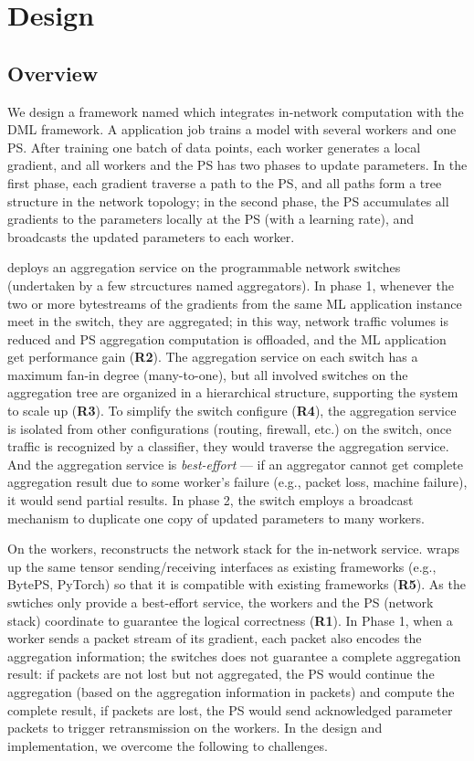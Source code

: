 \section{Design}
\subsection{Overview}
We design a framework named \sysname which integrates in-network computation with the DML framework. A \sysname application job trains a model with several workers and one PS. After training one batch of data points,  each worker generates a local gradient, and all workers and the PS has two phases to update parameters. In the first phase, each gradient traverse a path to the PS, and all paths form a tree structure in the network topology; in the second phase, the PS accumulates all gradients to the parameters locally at the PS (with a learning rate), and broadcasts the updated parameters to each worker.

\sysname deploys an aggregation service on the programmable network switches (undertaken by a few strcuctures named aggregators). In phase 1, whenever the two or more bytestreams of the gradients from the same ML application instance meet in the switch, they are aggregated; in this way, network traffic volumes is reduced and PS aggregation computation is offloaded, and the ML application get performance gain (\textbf{R2}). The aggregation service on each switch has a maximum fan-in degree (many-to-one), but all involved switches on the aggregation tree are organized in a hierarchical structure, supporting the system to scale up (\textbf{R3}). To simplify the switch configure (\textbf{R4}), the aggregation service is isolated from other configurations (routing, firewall, etc.) on the switch, once \sysname traffic is recognized by a classifier, they would traverse the aggregation service. And the aggregation service is \emph{best-effort} --- if an aggregator cannot get complete aggregation result due to some worker's failure (e.g., packet loss, machine failure), it would send partial results. In phase 2, the switch employs a broadcast mechanism to duplicate one copy of updated parameters to many workers.

On the workers, \sysname reconstructs the network stack for the in-network service. \sysname wraps up the same tensor sending/receiving interfaces as existing frameworks (e.g., BytePS, PyTorch) so that it is compatible with existing frameworks (\textbf{R5}). As the swtiches only provide a best-effort service, the workers and the PS (\sysname network stack) coordinate to guarantee the logical correctness (\textbf{R1}). In Phase 1, when a worker sends a packet stream of its gradient, each packet also encodes the aggregation information; the switches does not guarantee a complete aggregation result: if packets are not lost but not aggregated, the PS would continue the aggregation (based on the aggregation information in packets) and compute the complete result, if packets are lost, the PS would send acknowledged parameter packets to trigger retransmission on the workers. In the design and implementation, we overcome the following to challenges.

